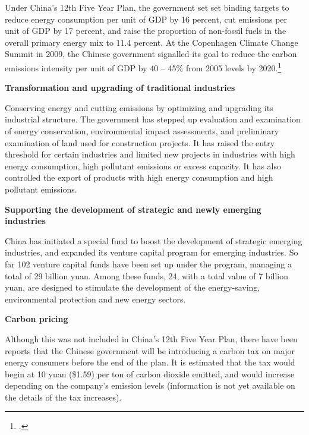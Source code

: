 Under China's 12th Five Year Plan, the government set set binding targets to reduce energy consumption per unit of GDP by 16 percent, cut  emissions per unit of GDP by 17 percent, and raise the proportion of non-fossil fuels in the overall primary energy mix to 11.4 percent.  
At the Copenhagen Climate Change Summit in 2009, the Chinese government signalled its goal to reduce the carbon emissions intensity per unit of GDP by 40 -- 45\% from 2005 levels by 2020.\footcite[][p. 108]{UNHumanDev2013}



\textbf{Transformation and upgrading of traditional industries}



Conserving energy and cutting emissions by optimizing and upgrading its industrial structure. 
The government has stepped up evaluation and examination of energy conservation, environmental impact assessments, and preliminary examination of land used for construction projects. 
It has raised the entry threshold for certain industries and limited new projects in industries with high energy consumption, high pollutant emissions or excess capacity. 
It has also controlled the export of products with high energy consumption and high pollutant emissions. 



\textbf{Supporting the development of strategic and newly emerging industries}



China has initiated a special fund to boost the development of strategic emerging industries, and expanded its venture capital program for emerging industries. 
So far 102 venture capital funds have been set up under the program, managing a total of 29 billion yuan. 
Among these funds, 24, with a total value of 7 billion yuan, are designed to stimulate the development of the energy-saving, environmental protection and new energy sectors.




\textbf{Carbon pricing}



Although this was not included in China's 12th Five Year Plan, there have been reports that the Chinese government will be introducing a carbon tax on major energy consumers before the end of the plan. 
It is estimated that the tax would begin at 10 yuan (\$1.59) per ton of carbon dioxide emitted, and would increase depending on the company’s emission levels (information is not yet available on the details of the tax increases).



